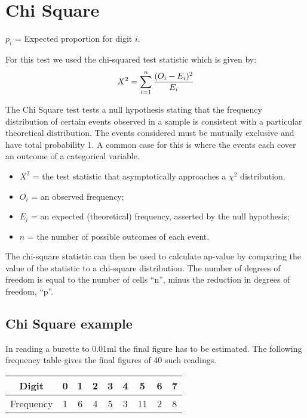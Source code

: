 \documentclass[]{report}
\begin{document}
\section{Chi Square}


$p_{i}$ = Expected proportion for digit $i$.

For this test we used the chi-squared test statistic which is given by:
\begin{equation}
X^2 = \sum_{i=1}^{n} {(O_i - E_i)^2 \over E_i}
\end{equation}


The Chi Square test tests a null hypothesis stating that the frequency distribution of certain events observed in a sample is consistent with a particular theoretical distribution. The events considered must be mutually exclusive and have total probability 1. A common case for this is where the events each cover an outcome of a categorical variable.

\begin{itemize}
	\item $X^2$ = the test statistic that asymptotically approaches a $\chi^2$ distribution.
	\item $O_i$ = an observed frequency;
	\item $E_i$ = an expected (theoretical) frequency, asserted by the null hypothesis;
	\item $n $  = the number of possible outcomes of each event.
\end{itemize}

The chi-square statistic can then be used to calculate ap-value by comparing the value of the statistic to a chi-square distribution. The number of degrees of freedom is equal to the number of cells ``n'', minus the reduction in degrees of freedom, ``p''.

\subsection{Chi Square example}
In reading a burette to 0.01ml the final figure has to be estimated.
The following frequency table gives the final figures of 40 such readings.

\begin{center}
\begin{tabular}{|c|c|c|c|c|c|c|c|c|}
	\hline
	Digit & 0 & 1 & 2 & 3 & 4 & 5 & 6 & 7 \\ \hline
	Frequency& 1 & 6 & 4 & 5 & 3 & 11 & 2 & 8 \\
	\hline
\end{tabular}
\end{center}
\end{document}
